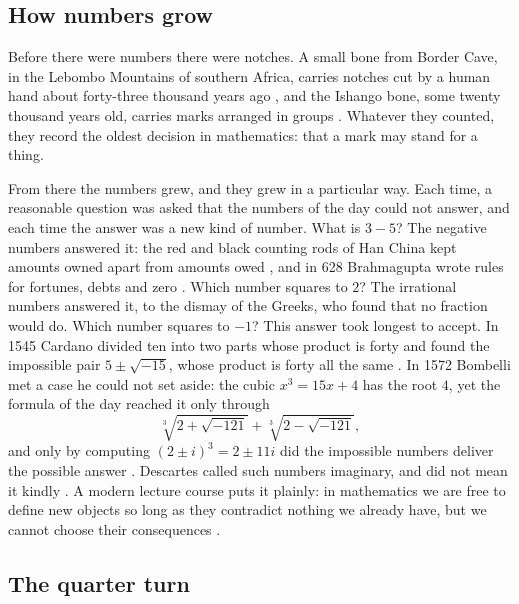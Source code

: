 \documentclass[11pt,a4paper]{amsart}
\theoremstyle{plain}
\theoremstyle{definition}
\theoremstyle{remark}
\begin{document}
\subsection{How numbers grow}

Before there were numbers there were notches. A small bone from Border Cave, in the Lebombo Mountains of southern Africa, carries notches cut by a human hand about forty-three thousand years ago \citep{dErrico2012}, and the Ishango bone, some twenty thousand years old, carries marks arranged in groups \citep{BrooksSmith1987}. Whatever they counted, they record the oldest decision in mathematics: that a mark may stand for a thing.

From there the numbers grew, and they grew in a particular way. Each time, a reasonable question was asked that the numbers of the day could not answer, and each time the answer was a new kind of number. What is $3 - 5$? The negative numbers answered it: the red and black counting rods of Han China kept amounts owned apart from amounts owed \citep{Shen1999}, and in 628 Brahmagupta wrote rules for fortunes, debts and zero \citep{Colebrooke1817,Plofker2009}. Which number squares to $2$? The irrational numbers answered it, to the dismay of the Greeks, who found that no fraction would do. Which number squares to $-1$? This answer took longest to accept. In 1545 Cardano divided ten into two parts whose product is forty and found the impossible pair $5 \pm \sqrt{-15}$, whose product is forty all the same \citep{Cardano1545}. In 1572 Bombelli met a case he could not set aside: the cubic $x^3 = 15x + 4$ has the root $4$, yet the formula of the day reached it only through
\[
\sqrt[3]{2 + \sqrt{-121}} + \sqrt[3]{2 - \sqrt{-121}} ,
\]
and only by computing $(2 \pm i)^3 = 2 \pm 11i$ did the impossible numbers deliver the possible answer \citep{Bombelli1572}. Descartes called such numbers imaginary, and did not mean it kindly \citep{Descartes1637}. A modern lecture course puts it plainly: in mathematics we are free to define new objects so long as they contradict nothing we already have, but we cannot choose their consequences \citep{MokhithiShock2020}.

\subsection{The quarter turn}
\end{document}
